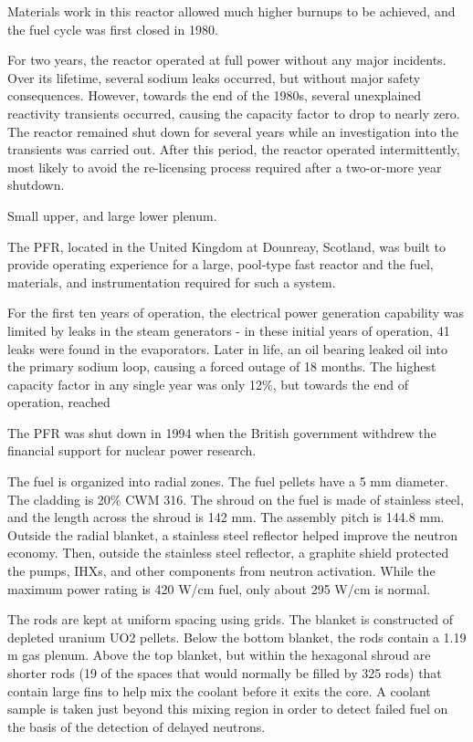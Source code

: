 \documentclass[10pt]{article}
\newcounter{subsubsubsection}[subsubsection]
\numberwithin{equation}{section} %
\begin{document}
Materials work in this reactor allowed much higher burnups to be achieved, and the fuel cycle was first closed in 1980. 

For two years, the reactor operated at full power without any major incidents. Over its lifetime, several sodium leaks occurred, but without major safety consequences. However, towards the end of the 1980s, several unexplained reactivity transients occurred, causing the capacity factor to drop to nearly zero. The reactor remained shut down for several years while an investigation into the transients was carried out. After this period, the reactor operated intermittently, most likely to avoid the re-licensing process required after a two-or-more year shutdown. 

Small upper, and large lower plenum.

The PFR, located in the United Kingdom at Dounreay, Scotland, was built to provide operating experience for a large, pool-type fast reactor and the fuel, materials, and instrumentation required for such a system. 

For the first ten years of operation, the electrical power generation capability was limited by leaks in the steam generators - in these initial years of operation, 41 leaks were found in the evaporators. Later in life, an oil bearing leaked oil into the primary sodium loop, causing a forced outage of 18 months. The highest capacity factor in any single year was only 12\%, but towards the end of operation, reached  \cite{LMFBR}

The PFR was shut down in 1994 when the British government withdrew the financial support for nuclear power research. 

The fuel is organized into radial zones. The fuel pellets have a 5 mm diameter. The cladding is 20\% CWM 316. The shroud on the fuel is made of stainless steel, and the length across the shroud is 142 mm. The assembly pitch is 144.8 mm. Outside the radial blanket, a stainless steel reflector helped improve the neutron economy. Then, outside the stainless steel reflector, a graphite shield protected the pumps, IHXs, and other components from neutron activation. While the maximum power rating is 420 W/cm fuel, only about 295 W/cm is normal.

The rods are kept at uniform spacing using grids. The blanket is constructed of depleted uranium UO2 pellets. Below the bottom blanket, the rods contain a 1.19 m gas plenum. Above the top blanket, but within the hexagonal shroud are shorter rods (19 of the spaces that would normally be filled by 325 rods) that contain large fins to help mix the coolant before it exits the core. A coolant sample is taken just beyond this mixing region in order to detect failed fuel on the basis of the detection of delayed neutrons. 
\end{document}
